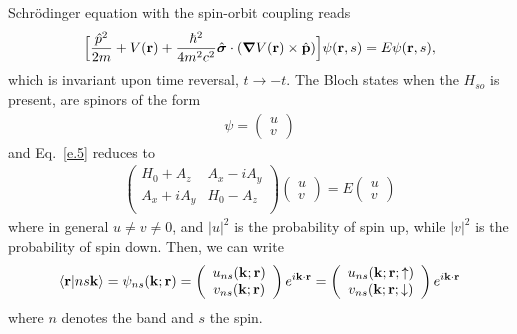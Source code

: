 \documentclass[floatfix,prb,aps,superscriptaddress,11pt]{revtex4}
\begin{document}
Schr\"odinger equation with the spin-orbit coupling reads 
\begin{align}\label{e.5}
\Big[\frac{\hat p^2}{2m} + V(\mathbf{r}) 
+\frac{\hbar^2}{4m^2c^2}\hat{\boldsymbol{\sigma}}\cdot(\boldsymbol{\nabla} V(\mathbf{r})\times\hat {\mathbf{p}}) 
\Big]\psi(\mathbf{r},s)=E\psi(\mathbf{r},s) 
,
\end{align} 
which is invariant upon time reversal, $t\to -t$. 
The Bloch states when the $H_{so}$ is present, are spinors of the form
\begin{eqnarray}\label{e.37n}
\psi=\left(\begin{array}{c}     
u  \\     
v  
\end{array}\right)     
\end{eqnarray}     
and Eq.~\eqref{e.5} reduces to
\begin{eqnarray}\label{e.37nn}
\left(\begin{array}{cc}    
H_0+A_z & A_x-iA_y  \\    
A_x+iA_y & H_0-A_z  \\    
\end{array}\right)     
\left(\begin{array}{c}     
u  \\     
v  
\end{array}\right)     
=
E
\left(\begin{array}{c}     
u  \\     
v  
\end{array}\right)     
\end{eqnarray}    
where in general $u\neq v\neq 0$, and
$|u|^2$ is the probability of spin up,  
while
$|v|^2$ is the probability of spin down. Then, we can write 
\begin{eqnarray}\label{e.38}
\langle {\mathbf{r}} | {ns\mathbf{k}} \rangle=\psi_{ns}(\mathbf{k};\mathbf{r})
=\left(\begin{array}{c}    
u_{n s}(\mathbf{k};\mathbf{r})  \\    
v_{n s}(\mathbf{k};\mathbf{r})  
\end{array}\right)     
e^{i\mathbf{k}\cdot\mathbf{r}}
=\left(\begin{array}{c}    
u_{n s}(\mathbf{k};\mathbf{r};\uparrow)  \\    
v_{n s}(\mathbf{k};\mathbf{r};\downarrow)  
\end{array}\right)     
e^{i\mathbf{k}\cdot\mathbf{r}}
\end{eqnarray}    
where $n$ denotes the band and $s$ the spin.
\end{document}
